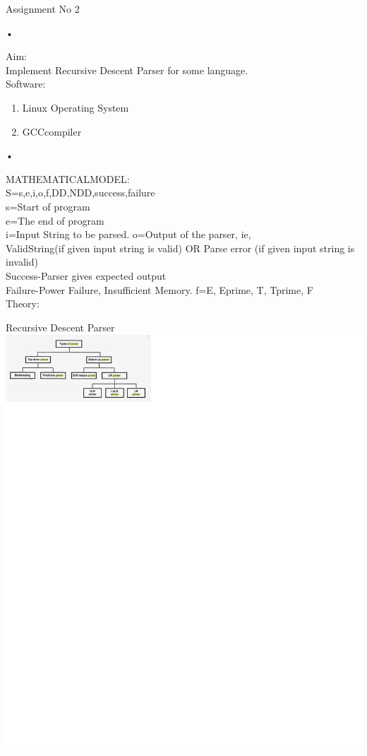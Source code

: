 \documentclass[11pt]{article}
\begin{document}
	
	\begin{center}
		Assignment No 2
	\end{center}•
	
	\noindent
	Aim:\\Implement Recursive Descent Parser for some language.\\
	
	\noindent
	Software:\\
	\begin{enumerate}
		\item Linux Operating System
		\item GCCcompiler
	\end{enumerate}•
	
	\noindent
	MATHEMATICALMODEL:\\
	
	\noindent
	S={s,e,i,o,f,DD,NDD,success,failure}\\
	s=Start of program\\
	e=The end of program\\
	i=Input String to be parsed. o=Output of the parser, ie, \\
	ValidString(if given input string is valid) OR Parse error (if given input string is invalid)\\
	Success-Parser gives expected output\\
	Failure-Power Failure, Insufficient Memory. f={E, Eprime, T, Tprime, F}\\
	
	\noindent
	Theory:
	
	\noindent
	Recursive Descent Parser\\
	
	\includegraphics{image1.png}
	
\end{document}

